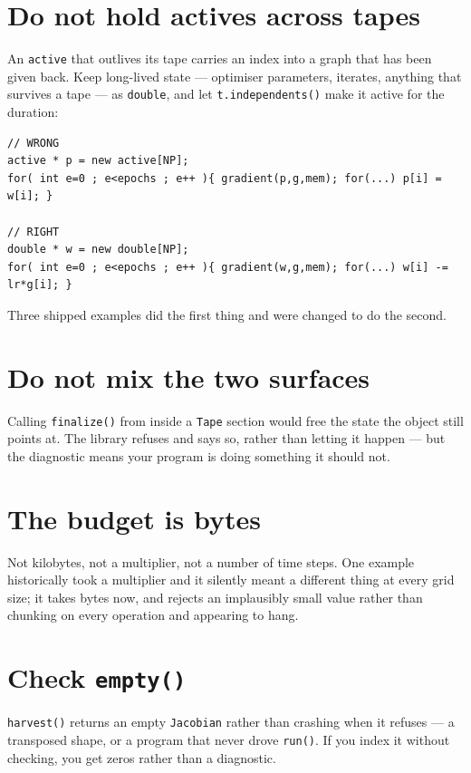 \documentclass[11pt,a4paper]{report}
\newcommand{\code}[1]{\texttt{#1}}
\begin{document}
\section{Do not hold actives across tapes}

An \code{active} that outlives its tape carries an index into a graph that has
been given back. Keep long-lived state --- optimiser parameters, iterates,
anything that survives a tape --- as \code{double}, and let
\code{t.independents()} make it active for the duration:

\begin{lstlisting}
// WRONG
active * p = new active[NP];
for( int e=0 ; e<epochs ; e++ ){ gradient(p,g,mem); for(...) p[i] = w[i]; }

// RIGHT
double * w = new double[NP];
for( int e=0 ; e<epochs ; e++ ){ gradient(w,g,mem); for(...) w[i] -= lr*g[i]; }
\end{lstlisting}

\noindent
Three shipped examples did the first thing and were changed to do the second.

\section{Do not mix the two surfaces}

Calling \code{finalize()} from inside a \code{Tape} section would free the state
the object still points at. The library refuses and says so, rather than letting
it happen --- but the diagnostic means your program is doing something it should
not.

\section{The budget is bytes}

Not kilobytes, not a multiplier, not a number of time steps. One example
historically took a multiplier and it silently meant a different thing at every
grid size; it takes bytes now, and rejects an implausibly small value rather
than chunking on every operation and appearing to hang.

\section{Check \code{empty()}}

\code{harvest()} returns an empty \code{Jacobian} rather than crashing when it
refuses --- a transposed shape, or a program that never drove \code{run()}. If
you index it without checking, you get zeros rather than a diagnostic.
\end{document}

